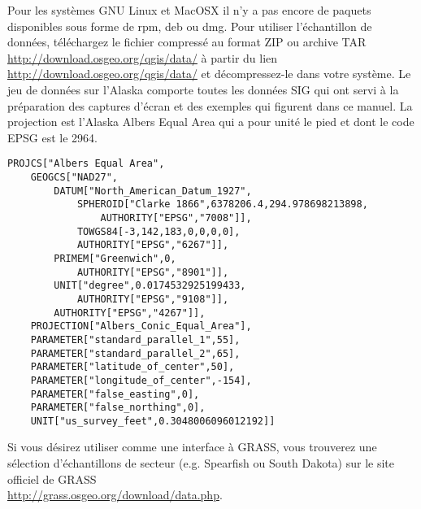 \nix \osx Pour les systèmes GNU Linux et MacOSX il n'y a pas encore de paquets disponibles sous forme de rpm, deb ou dmg. Pour utiliser l'échantillon de données, téléchargez le fichier compressé au format ZIP ou archive TAR \url{http://download.osgeo.org/qgis/data/}
à partir du lien \url{http://download.osgeo.org/qgis/data/} et décompressez-le dans votre système. Le jeu de données sur l'Alaska comporte toutes les données SIG qui ont servi à la préparation des captures d'écran et des exemples qui figurent dans ce manuel. La projection
est l'Alaska Albers Equal Area qui a pour unité le pied et dont le code EPSG est le 2964.
\par
\begin{verbatim}
PROJCS["Albers Equal Area",
    GEOGCS["NAD27",
        DATUM["North_American_Datum_1927",
            SPHEROID["Clarke 1866",6378206.4,294.978698213898,
                AUTHORITY["EPSG","7008"]],
            TOWGS84[-3,142,183,0,0,0,0],
            AUTHORITY["EPSG","6267"]],
        PRIMEM["Greenwich",0,
            AUTHORITY["EPSG","8901"]],
        UNIT["degree",0.0174532925199433,
            AUTHORITY["EPSG","9108"]],
        AUTHORITY["EPSG","4267"]],
    PROJECTION["Albers_Conic_Equal_Area"],
    PARAMETER["standard_parallel_1",55],
    PARAMETER["standard_parallel_2",65],
    PARAMETER["latitude_of_center",50],
    PARAMETER["longitude_of_center",-154],
    PARAMETER["false_easting",0],
    PARAMETER["false_northing",0],
    UNIT["us_survey_feet",0.3048006096012192]]
\end{verbatim}


Si vous désirez utiliser \qg comme une interface à GRASS, vous trouverez une sélection d'échantillons de secteur (e.g. Spearfish ou South Dakota) sur le site officiel de GRASS \\
\url{http://grass.osgeo.org/download/data.php}. 



